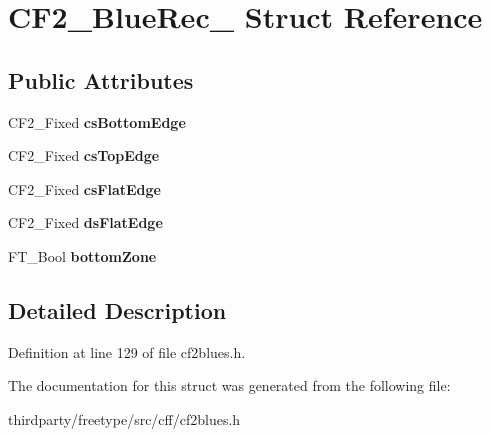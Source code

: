 \hypertarget{struct_c_f2___blue_rec__}{}\section{C\+F2\+\_\+\+Blue\+Rec\+\_\+ Struct Reference}
\label{struct_c_f2___blue_rec__}
\subsection*{Public Attributes}
\begin{DoxyCompactItemize}
\item 
\mbox{\label{struct_c_f2___blue_rec___a532506992d6f211b9832746fdfb9cb91}} 
C\+F2\+\_\+\+Fixed {\bfseries cs\+Bottom\+Edge}
\item 
\mbox{\label{struct_c_f2___blue_rec___af13ef694b3101f54ad1fc66f8633ee79}} 
C\+F2\+\_\+\+Fixed {\bfseries cs\+Top\+Edge}
\item 
\mbox{\label{struct_c_f2___blue_rec___abffbd735b33ab277942a151ec99c6a11}} 
C\+F2\+\_\+\+Fixed {\bfseries cs\+Flat\+Edge}
\item 
\mbox{\label{struct_c_f2___blue_rec___a370d9e029cae361fc9d4fe80a15c9636}} 
C\+F2\+\_\+\+Fixed {\bfseries ds\+Flat\+Edge}
\item 
\mbox{\label{struct_c_f2___blue_rec___a69885442fc085c422a80284c3b9639ae}} 
F\+T\+\_\+\+Bool {\bfseries bottom\+Zone}
\end{DoxyCompactItemize}


\subsection{Detailed Description}


Definition at line 129 of file cf2blues.\+h.



The documentation for this struct was generated from the following file\+:\begin{DoxyCompactItemize}
\item 
thirdparty/freetype/src/cff/cf2blues.\+h\end{DoxyCompactItemize}
